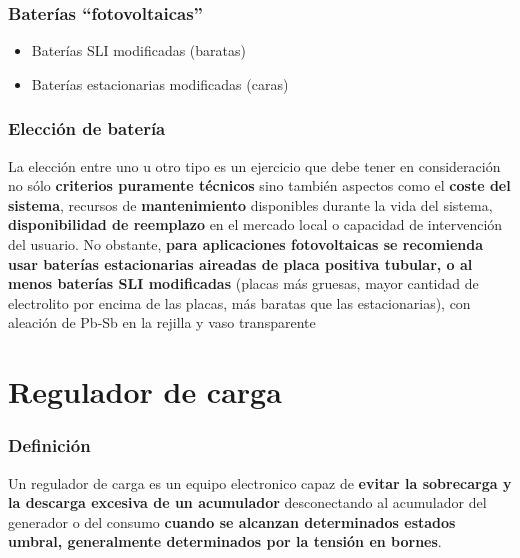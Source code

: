 \documentclass[serif, xcolor=dvipsnames]{beamer}
\begin{document}
\begin{frame}
\frametitle{Baterías {}``fotovoltaicas''}
\begin{block}
{}
\begin{itemize}
\item Baterías SLI modificadas (baratas)
\item Baterías estacionarias modificadas (caras)
\end{itemize}
\end{block}

\end{frame}

\begin{frame}
\frametitle{Elección de batería}

La elección entre uno u otro tipo es un ejercicio que debe tener en
consideración no sólo \textbf{criterios puramente técnicos} sino también
aspectos como el \textbf{coste del sistema}, recursos de \textbf{mantenimiento}
disponibles durante la vida del sistema, \textbf{disponibilidad de
reemplazo} en el mercado local o capacidad de intervención del usuario.
No obstante, \textbf{para aplicaciones fotovoltaicas se recomienda
usar baterías estacionarias aireadas de placa positiva tubular, o
al menos baterías SLI modificadas }(placas más gruesas, mayor cantidad
de electrolito por encima de las placas, más baratas que las estacionarias),
con aleación de Pb-Sb en la rejilla y vaso transparente 


\end{frame}

\section{Regulador de carga}


\begin{frame}
\frametitle{Definición}
\begin{block}
{}

Un regulador de carga es un equipo electronico capaz de \textbf{evitar
la sobrecarga y la descarga excesiva de un acumulador} desconectando
al acumulador del generador o del consumo \textbf{cuando se alcanzan
determinados estados umbral, generalmente determinados por la tensión
en bornes}.

\end{block}

\end{frame}
\end{document}

